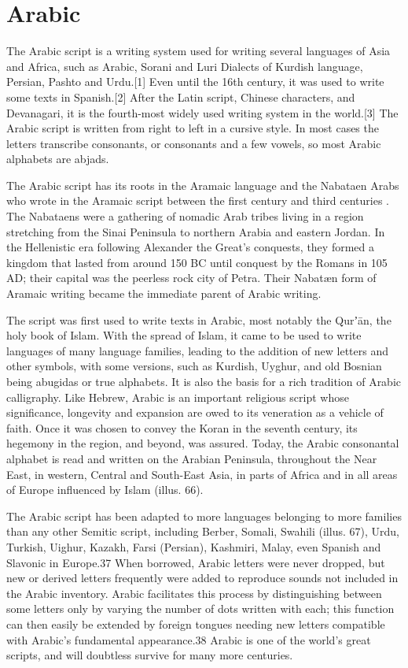 \section{Arabic}
\label{s:arabic}

The Arabic script is a writing system used for writing several languages of Asia and Africa, such as Arabic, Sorani and Luri Dialects of Kurdish language, Persian, Pashto and Urdu.[1] Even until the 16th century, it was used to write some texts in Spanish.[2] After the Latin script, Chinese characters, and Devanagari, it is the fourth-most widely used writing system in the world.[3]
The Arabic script is written from right to left in a cursive style. In most cases the letters transcribe consonants, or consonants and a few vowels, so most Arabic alphabets are abjads.

The Arabic script has its roots in the Aramaic language and the Nabataen Arabs who wrote in the Aramaic script between the first century \BC{} and third centuries \AD{}. The Nabataens were a gathering of nomadic Arab tribes living
in a region stretching from the Sinai Peninsula to northern
Arabia and eastern Jordan. In the Hellenistic era following
Alexander the Great’s conquests, they formed a kingdom that
lasted from around 150 BC until conquest by the Romans in 105
AD; their capital was the peerless rock city of Petra. Their
Nabatæn form of Aramaic writing became the immediate
parent of Arabic writing.   

The script was first used to write texts in Arabic, most notably the Qurʼān, the holy book of Islam. With the spread of Islam, it came to be used to write languages of many language families, leading to the addition of new letters and other symbols, with some versions, such as Kurdish, Uyghur, and old Bosnian being abugidas or true alphabets. It is also the basis for a rich tradition of Arabic calligraphy. Like Hebrew, Arabic is an important religious script whose
significance, longevity and expansion are owed to its veneration as a vehicle of faith. Once it was chosen to convey the Koran in the seventh
century, its hegemony in the region, and beyond, was assured.
Today, the Arabic consonantal alphabet is read and written on
the Arabian Peninsula, throughout the Near East, in western,
Central and South-East Asia, in parts of Africa and in all areas of
Europe influenced by Islam (illus. 66). 

The Arabic script has
been adapted to more languages belonging to more families
than any other Semitic script, including Berber, Somali, Swahili
(illus. 67), Urdu, Turkish, Uighur, Kazakh, Farsi (Persian),
Kashmiri, Malay, even Spanish and Slavonic in Europe.37 When
borrowed, Arabic letters were never dropped, but new or
derived letters frequently were added to reproduce sounds not
included in the Arabic inventory. Arabic facilitates this process
by distinguishing between some letters only by varying the
number of dots written with each; this function can then easily
be extended by foreign tongues needing new letters compatible
with Arabic’s fundamental appearance.38 Arabic is one of the
world’s great scripts, and will doubtless survive for many more
centuries.


